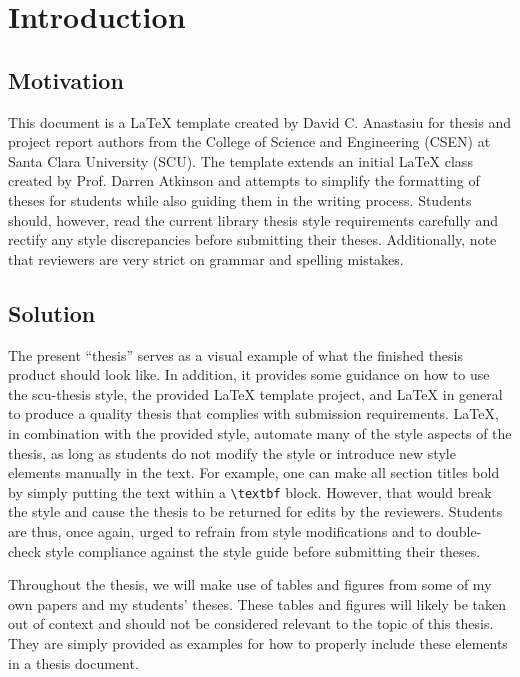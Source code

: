\chapter{Introduction}

\section{Motivation}

This document is a LaTeX template created by David C. Anastasiu for thesis and project report authors from the College of Science and Engineering (CSEN) at Santa Clara University (SCU). The template extends an initial LaTeX class created by Prof. Darren Atkinson and attempts to simplify the formatting of theses for students while also guiding them in the writing process. Students should, however, read the current library thesis style requirements carefully and rectify any style discrepancies before submitting their theses. Additionally, note that reviewers are very strict on grammar and spelling mistakes.


\section{Solution}

The present ``thesis'' serves as a visual example of what the finished thesis product should look like. In addition, it provides some guidance on how to use the scu-thesis style, the provided LaTeX template project, and LaTeX in general to produce a quality thesis that complies with submission requirements. LaTeX, in combination with the provided style, automate many of the style aspects of the thesis, as long as students do not modify the style or introduce new style elements manually in the text. For example, one can make all section titles bold by simply putting the text within a \texttt{{\textbackslash}textbf} block. However, that would break the style and cause the thesis to be returned for edits by the reviewers. Students are thus, once again, urged to refrain from style modifications and to double-check style compliance against the style guide before submitting their theses.

Throughout the thesis, we will make use of tables and figures from some of my own papers and my students' theses. These tables and figures will likely be taken out of context and should not be considered relevant to the topic of this thesis. They are simply provided as examples for how to properly include these elements in a thesis document.

